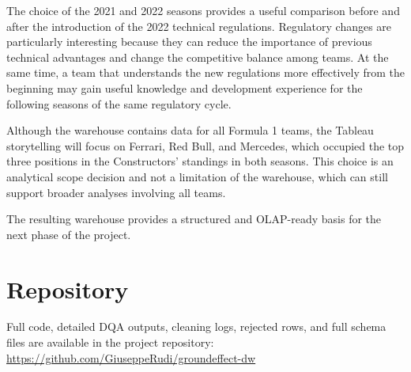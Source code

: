 \documentclass[11pt,a4paper]{article}
\begin{document}
	The choice of the 2021 and 2022 seasons provides a useful comparison before and after the introduction of the 2022 technical regulations.
	Regulatory changes are particularly interesting because they can reduce the importance of previous technical advantages and change the competitive balance among teams.
	At the same time, a team that understands the new regulations more effectively from the beginning may gain useful knowledge and development experience for the following seasons of the same regulatory cycle.
	
	Although the warehouse contains data for all Formula 1 teams, the Tableau storytelling will focus on Ferrari, Red Bull, and Mercedes, which occupied the top three positions in the Constructors' standings in both seasons.
	This choice is an analytical scope decision and not a limitation of the warehouse, which can still support broader analyses involving all teams.
	
	The resulting warehouse provides a structured and OLAP-ready basis for the next phase of the project.

	\section{Repository}
	\label{sec:repository-material}
	
	Full code, detailed DQA outputs, cleaning logs, rejected rows, and full schema files are available in the project repository:
	\url{https://github.com/GiuseppeRudi/groundeffect-dw}
	
\end{document}
